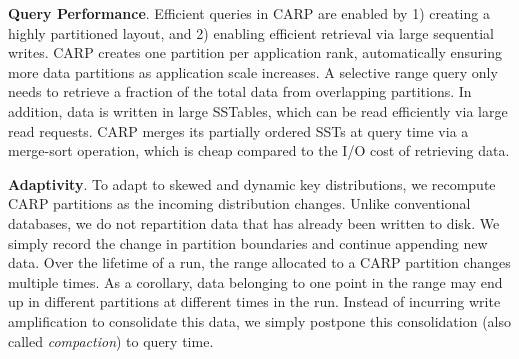 \textbf{Query Performance}.
Efficient queries in CARP are enabled by 1) creating a highly partitioned layout, and 2) enabling
efficient retrieval via large sequential writes.
CARP creates one partition per application rank, automatically ensuring more data partitions as
application scale increases.
A selective range query only needs to retrieve a fraction of the total data from overlapping
partitions.
In addition, data is written in large SSTables, which can be read efficiently via large read
requests.
CARP merges its partially ordered SSTs at query time via a merge-sort operation, which is cheap
compared to the I/O cost of retrieving data.

\textbf{Adaptivity}.
To adapt to skewed and dynamic key distributions, we recompute CARP partitions as the incoming
distribution changes.
Unlike conventional databases, we do not repartition data that has already been written to disk.
We simply record the change in partition boundaries and continue appending new data.
Over the lifetime of a run, the range allocated to a CARP partition changes multiple times.
As a corollary, data belonging to one point in the range may end up in different partitions at
different times in the run.
Instead of incurring write amplification to consolidate this data, we simply postpone this
consolidation (also called \emph{compaction}) to query time.
